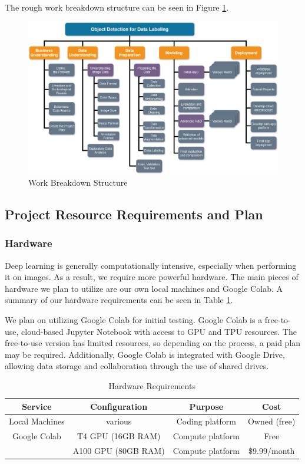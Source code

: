\documentclass[stu,12pt,floatsintext]{apa7}
\begin{document}
The rough work breakdown structure can be seen in Figure \ref{fig:wbs}.
\begin{figure}[!htb]
	\centering
	\includegraphics[width=1\linewidth]{./images/WBS.png}
	\caption{Work Breakdown Structure}
	\label{fig:wbs}
\end{figure}


\subsection{Project Resource Requirements and Plan}
\subsubsection{Hardware}
Deep learning is generally computationally intensive, especially when performing it on images. As a result, we require more powerful hardware. The main pieces of hardware we plan to utilize are our own local machines and Google Colab. A summary of our hardware requirements can be seen in Table \ref{tab:hardware}.

We plan on utilizing Google Colab for initial testing. Google Colab is a free-to-use, cloud-based Jupyter Notebook with access to GPU and TPU resources. The free-to-use version has limited resources, so depending on the process, a paid plan may be required. Additionally, Google Colab is integrated with Google Drive, allowing data storage and collaboration through the use of shared drives.

\begin{table}[!htb]
	\centering
	\caption{Hardware Requirements}
	\begin{tabular}{cccc}
		\hline
		Service        & Configuration     & Purpose          & Cost         \\
		\hline
		Local Machines & various           & Coding platform  & Owned (free) \\
		Google Colab   & T4 GPU (16GB RAM) & Compute platform & Free         \\
		& A100 GPU (80GB RAM) & Compute platform & \$9.99/month         \\
		\hline
	\end{tabular}
	\label{tab:hardware}
\end{table}
\end{document}
